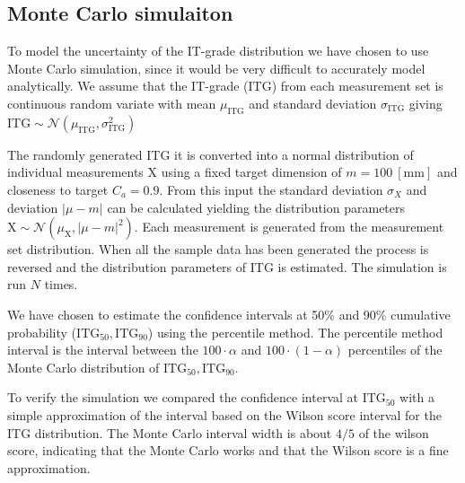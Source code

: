 \documentclass[aip,amsmath, reprint, author-year]{revtex4-1}
\begin{document}
\subsection{Monte Carlo simulaiton}
To model the uncertainty of the IT-grade distribution we have chosen to use Monte Carlo simulation, since it would be very difficult to accurately model analytically. 
We assume that the IT-grade (ITG) from each measurement set is continuous random variate with mean $\mu_{\mathrm{ITG}}$ and standard deviation $\sigma_{\mathrm{ITG}}$ giving $\mathrm{ITG} \sim \mathcal{N} (\mu_{\mathrm{ITG}}, \sigma_{\mathrm{ITG}}^2)$

The randomly generated ITG it is converted into a normal distribution of individual measurements X using a fixed target dimension of $m = 100 \mathrm{\ [mm]}$ and closeness to target $C_a = 0.9$. From this input the standard deviation $\sigma_{X}$ and deviation $| \mu - m|$ can be calculated yielding the distribution parameters $\mathrm{X} \sim \mathcal{N} (\mu_{\mathrm{X}}, {| \mu - m|}^2)$. 
Each measurement is generated from the measurement set distribution.
When all the sample data has been generated the process is reversed and the distribution parameters of ITG is estimated. The simulation is run $N$ times.   

We have chosen to estimate the confidence intervals at 50\% and 90\% cumulative probability ($\mathrm{ITG_{50}}, \mathrm{ITG_{90}}$) using the percentile method. The percentile method interval is the interval between the $100 \cdot \alpha$ and $100 \cdot (1-\alpha)$ percentiles of the Monte Carlo distribution of $\mathrm{ITG_{50}}, \mathrm{ITG_{90}}$.

To verify the simulation we compared the confidence interval at $\mathrm{ITG_{50}}$ with a simple approximation of the interval based on the Wilson score interval for the ITG distribution. The Monte Carlo interval width is about $4/5$ of the wilson score, indicating that the Monte Carlo works and that the Wilson score is a fine approximation. 
\end{document}
